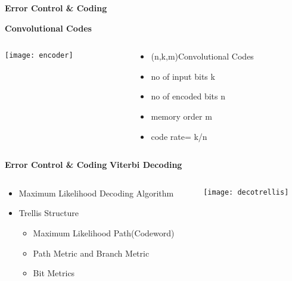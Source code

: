 \documentclass{beamer}
\begin{document}
\begin{frame}{\scriptsize \LARGE \centering \textbf{Error Control \& Coding}}
\begin{block}{\textbf{Convolutional Codes}}
\begin{columns}
\begin{column}{5cm}
	\texttt{[image: encoder]}
\end{column}
	\begin{column}{5cm}
		\begin{itemize}
\pause
\item (n,k,m)Convolutional Codes
\pause
\item no of input bits k
\item no of encoded bits n
\item memory order m
\item code rate= k/n
		\end{itemize}
	\end{column}
\end{columns}
\end{block}	
\end{frame}


\begin{frame}{\scriptsize \LARGE \centering \textbf{Error Control \& Coding}}
\textbf{Viterbi Decoding}
\begin{columns}
\begin{column}{5cm}	
	\begin{itemize}
	\pause
		\item Maximum Likelihood  Decoding Algorithm 
		\pause
		\item Trellis Structure
		
		\begin{itemize}
		\pause
		\item Maximum Likelihood Path(Codeword)
		\pause
		\item Path Metric and Branch Metric
		\pause
		\item Bit Metrics
		
	\end{itemize}
		
	\end{itemize}
	\end{column}
	\begin{column}{7cm}	
	\begin{center}
	\texttt{[image: decotrellis]}
	\end{center}
	\end{column}
	\end{columns}
\end{frame}
\end{document}
